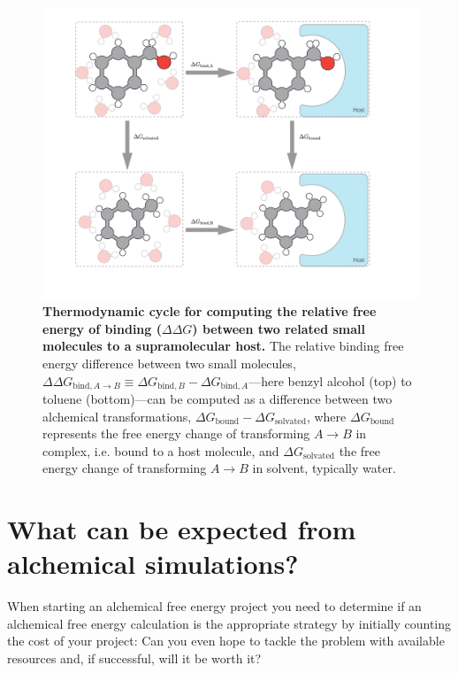\documentclass[9pt,bestpractices]{livecoms}
\begin{document}
\begin{figure}
    \includegraphics[width=0.95\linewidth]{figures/fig2_therm_cyc/Figure.pdf}
    \caption{{\bf Thermodynamic cycle for computing the relative free energy of binding ($\Delta \Delta G$) between two related small molecules to a supramolecular host.}
    The relative binding free energy difference between two small molecules, $\Delta \Delta G_{\mathrm{bind}, A \rightarrow B} \equiv \Delta G_{\mathrm{bind}, B} - \Delta G_{\mathrm{bind}, A}$---here benzyl alcohol (top) to toluene (bottom)---can be computed as a difference between two alchemical transformations, $\Delta G_\mathrm{bound} - \Delta G_\mathrm{solvated}$, where $\Delta G_\mathrm{bound}$ represents the free energy change of transforming $A \rightarrow B$ in complex, i.e. bound to a host molecule, and $\Delta G_\mathrm{solvated}$ the free energy change of transforming $A \rightarrow B$ in solvent, typically water.}
    \label{fig:fig_binding_thermodynamic_cycle}
\end{figure}



\section{What can be expected from alchemical simulations?}
\label{sec:step0}
When starting an alchemical free energy project you need to determine if an alchemical free energy calculation is the appropriate strategy by initially counting the cost of your
project: Can you even hope to tackle the problem with available resources and, if successful, will it
be worth it?
\end{document}
